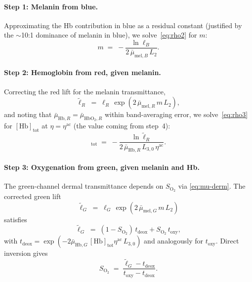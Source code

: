 \documentclass[10pt,twocolumn,a4paper]{article}
\theoremstyle{definition}
\newcommand{\Hb}{\mathrm{Hb}}
\newcommand{\HbO}{\mathrm{HbO_2}}
\newcommand{\vaso}{\eta}
\newcommand{\melan}{m}
\newcommand{\Hbconc}{[\Hb]_{\mathrm{tot}}}
\newcommand{\Soxy}{S_{\mathrm{O_2}}}
\begin{document}
\paragraph{Step 1: Melanin from blue.} Approximating the Hb
contribution in blue as a residual constant (justified by the
$\sim$10:1 dominance of melanin in blue), we solve~\cref{eq:rho2} for
$\melan$:
\begin{equation}
    \melan
    \;=\;
    -\frac{\ln \ell_{B}}{2\,\bar{\mu}_{\mathrm{mel},B}\,L_{2}}.
    \label{eq:invert-melanin}
\end{equation}

\paragraph{Step 2: Hemoglobin from red, given melanin.} Correcting the
red lift for the melanin transmittance,
\begin{equation}
    \tilde{\ell}_{R}
    \;=\; \ell_{R}\,\exp(2\,\bar{\mu}_{\mathrm{mel},R}\, \melan\, L_{2}),
    \label{eq:tilde-ellR}
\end{equation}
and noting that $\bar{\mu}_{\Hb,R}=\bar{\mu}_{\HbO,R}$ within band-averaging error,
we solve~\cref{eq:rho3} for $\Hbconc$ at $\vaso=\vaso^{\mathrm{ac}}$
(the value coming from step~4):
\begin{equation}
    \Hbconc
    \;=\;
    -\frac{\ln \tilde{\ell}_{R}}{2\,\bar{\mu}_{\Hb,R}\,L_{3,0}\,\vaso^{\mathrm{ac}}}.
    \label{eq:invert-hb}
\end{equation}

\paragraph{Step 3: Oxygenation from green, given melanin and Hb.} The
green-channel dermal transmittance depends on $\Soxy$ via
\cref{eq:mu-derm}. The corrected green lift
\begin{equation}
    \tilde{\ell}_{G}
    \;=\; \ell_{G}\,\exp(2\,\bar{\mu}_{\mathrm{mel},G}\, \melan\, L_{2})
\end{equation}
satisfies
\begin{equation}
    \tilde{\ell}_{G} \;=\; (1-\Soxy)\, t_{\mathrm{deox}} + \Soxy\, t_{\mathrm{oxy}},
\end{equation}
with
$t_{\mathrm{deox}}=\exp(-2\bar{\mu}_{\Hb,G}\,\Hbconc \vaso^{\mathrm{ac}}\,L_{3,0})$
and analogously for $t_{\mathrm{oxy}}$. Direct inversion gives
\begin{equation}
    \Soxy
    \;=\;
    \frac{\tilde{\ell}_{G} - t_{\mathrm{deox}}}{t_{\mathrm{oxy}} - t_{\mathrm{deox}}}.
    \label{eq:invert-spo2}
\end{equation}
\end{document}
